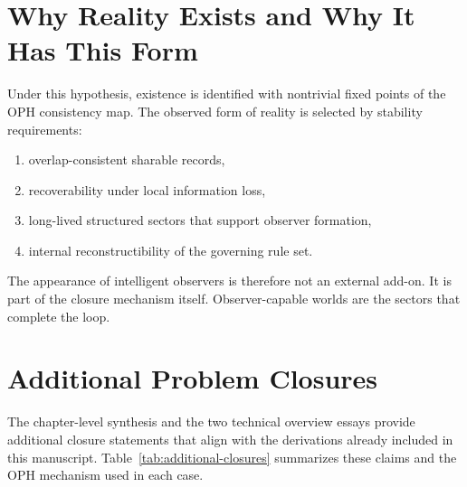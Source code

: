 \documentclass[11pt]{article}
\begin{document}
\section{Why Reality Exists and Why It Has This Form}
Under this hypothesis, existence is identified with nontrivial fixed points of the OPH consistency map. The observed form of reality is selected by stability requirements:
\begin{enumerate}
\item overlap-consistent sharable records,
\item recoverability under local information loss,
\item long-lived structured sectors that support observer formation,
\item internal reconstructibility of the governing rule set.
\end{enumerate}
The appearance of intelligent observers is therefore not an external add-on. It is part of the closure mechanism itself. Observer-capable worlds are the sectors that complete the loop.

\section{Additional Problem Closures}
The chapter-level synthesis and the two technical overview essays provide additional closure statements that align with the derivations already included in this manuscript. Table~\ref{tab:additional-closures} summarizes these claims and the OPH mechanism used in each case.
\end{document}
